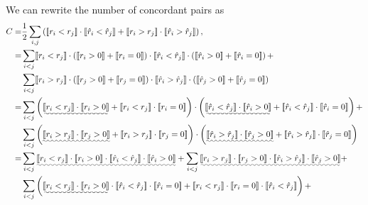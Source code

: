 
We can rewrite the number of concordant pairs as
\begin{align*}
C =& \frac{1}{2} \sum_{i,j} \left(\llb r_i < r_j \rrb \cdot \llb \hat{r}_i < \hat{r}_j \rrb +
     \llb r_i > r_j \rrb \cdot \llb \hat{r}_i > \hat{r}_j \rrb \right), \\
  =& \sum_{i < j} \llb r_i < r_j \rrb \cdot 
     \left( \llb r_i > 0 \rrb + \llb r_i = 0 \rrb \right) \cdot 
     \llb \hat{r}_i < \hat{r}_j \rrb \cdot
     \left( \llb \hat{r}_i > 0 \rrb + \llb \hat{r}_i = 0 \rrb \right) + \\
   & \sum_{i < j} \llb r_i > r_j \rrb \cdot 
     \left( \llb r_j > 0 \rrb + \llb r_j = 0 \rrb \right) \cdot
     \llb \hat{r}_i > \hat{r}_j \rrb \cdot
     \left( \llb \hat{r}_j > 0 \rrb + \llb \hat{r}_j = 0 \rrb \right) \\
  =& \sum_{i < j} \left( \uwave{\llb r_i < r_j \rrb \cdot \llb r_i > 0 \rrb} +
            \llb r_i < r_j \rrb \cdot \llb r_i = 0 \rrb \right) \cdot 
     \left( \uwave{\llb \hat{r}_i < \hat{r}_j \rrb \cdot \llb \hat{r}_i > 0 \rrb} + 
            \llb \hat{r}_i < \hat{r}_j \rrb \cdot \llb \hat{r}_i = 0 \rrb \right) + \\
   & \sum_{i < j} \left( \uwave{\llb r_i > r_j \rrb \cdot \llb r_j > 0 \rrb} + 
            \llb r_i > r_j \rrb \cdot \llb r_j = 0 \rrb \right) \cdot
     \left( \uwave{\llb \hat{r}_i > \hat{r}_j \rrb \cdot \llb \hat{r}_j > 0 \rrb} + 
            \llb \hat{r}_i > \hat{r}_j \rrb \cdot \llb \hat{r}_j = 0 \rrb \right) \\
  =& \sum_{i < j} \uwave{\llb r_i < r_j \rrb \cdot \llb r_i > 0 \rrb \cdot
                         \llb \hat{r}_i < \hat{r}_j \rrb \cdot \llb \hat{r}_i > 0 \rrb} +
     \sum_{i < j} \uwave{\llb r_i > r_j \rrb \cdot \llb r_j > 0 \rrb \cdot
                         \llb \hat{r}_i > \hat{r}_j \rrb \cdot \llb \hat{r}_j > 0 \rrb} + \\
   & \sum_{i < j} \left( \uwave{\llb r_i < r_j \rrb \cdot \llb r_i > 0 \rrb} \cdot
                         \llb \hat{r}_i < \hat{r}_j \rrb \cdot \llb \hat{r}_i = 0 \rrb + 
                         \llb r_i < r_j \rrb \cdot \llb r_i = 0 \rrb \cdot 
                         \llb \hat{r}_i < \hat{r}_j \rrb \right) + \\ 

\end{align*}
